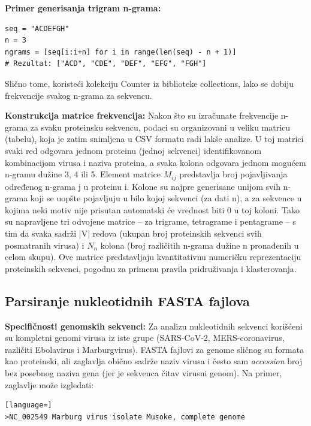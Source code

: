 \documentclass[a4paper,12pt]{article}
\begin{document}
\textbf{Primer generisanja trigram n-grama:}

\begin{lstlisting}
seq = "ACDEFGH"
n = 3
ngrams = [seq[i:i+n] for i in range(len(seq) - n + 1)]
# Rezultat: ["ACD", "CDE", "DEF", "EFG", "FGH"]
\end{lstlisting}

Slično tome, koristeći kolekciju Counter iz biblioteke collections, lako se dobiju frekvencije svakog n-grama
za sekvencu.

\vspace{10pt}
\textbf{Konstrukcija matrice frekvencija:} Nakon što su izračunate frekvencije n-grama za svaku proteinsku
sekvencu, podaci su organizovani u veliku matricu (tabelu), koja je zatim snimljena u CSV formatu radi lakše
analize. U toj matrici svaki red odgovara jednom proteinu (jednoj sekvenci) identifikovanom kombinacijom
virusa i naziva proteina, a svaka kolona odgovara jednom mogućem n-gramu dužine 3, 4 ili 5. Element
matrice $M_{ij}$ predstavlja broj pojavljivanja određenog n-grama j u proteinu i. Kolone su najpre
generisane unijom svih n-grama koji se uopšte pojavljuju u bilo kojoj sekvenci (za dati n), a za sekvence u
kojima neki motiv nije prisutan automatski će vrednost biti 0 u toj koloni. Tako su napravljene tri odvojene
matrice – za trigrame, tetragrame i pentagrame – s tim da svaka sadrži |V| redova (ukupan broj proteinskih
sekvenci svih posmatranih virusa) i $N_{n}$ kolona (broj različitih n-grama dužine n pronađenih u
celom skupu). Ove matrice predstavljaju kvantitativnu numeričku reprezentaciju proteinskih sekvenci,
pogodnu za primenu pravila pridruživanja i klasterovanja.

\subsection{Parsiranje nukleotidnih FASTA fajlova}

\textbf{Specifičnosti genomskih sekvenci:} Za analizu nukleotidnih sekvenci korišćeni su kompletni genomi virusa
iz iste grupe (SARS-CoV-2, MERS-coronavirus, različiti Ebolavirus i Marburgvirus). FASTA fajlovi za genome
sličnog su formata kao proteinski, ali zaglavlja obično sadrže naziv virusa i često sam \textit{accession} broj
bez posebnog naziva gena (jer je sekvenca čitav virusni genom). Na primer, zaglavlje može izgledati:

\begin{lstlisting}[language=]
>NC_002549 Marburg virus isolate Musoke, complete genome
\end{lstlisting}
\end{document}
